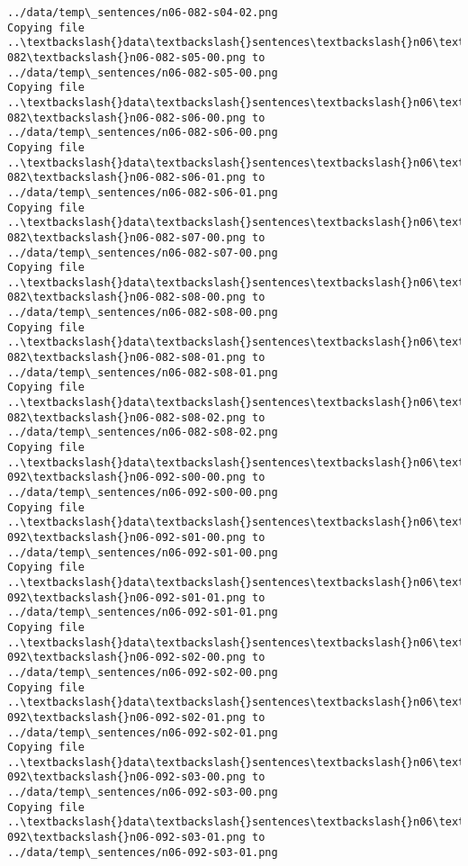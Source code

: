 \documentclass[11pt]{article}
\begin{document}
\begin{Verbatim}[commandchars=\\\{\}]
../data/temp\_sentences/n06-082-s04-02.png
Copying file ..\textbackslash{}data\textbackslash{}sentences\textbackslash{}n06\textbackslash{}n06-082\textbackslash{}n06-082-s05-00.png to
../data/temp\_sentences/n06-082-s05-00.png
Copying file ..\textbackslash{}data\textbackslash{}sentences\textbackslash{}n06\textbackslash{}n06-082\textbackslash{}n06-082-s06-00.png to
../data/temp\_sentences/n06-082-s06-00.png
Copying file ..\textbackslash{}data\textbackslash{}sentences\textbackslash{}n06\textbackslash{}n06-082\textbackslash{}n06-082-s06-01.png to
../data/temp\_sentences/n06-082-s06-01.png
Copying file ..\textbackslash{}data\textbackslash{}sentences\textbackslash{}n06\textbackslash{}n06-082\textbackslash{}n06-082-s07-00.png to
../data/temp\_sentences/n06-082-s07-00.png
Copying file ..\textbackslash{}data\textbackslash{}sentences\textbackslash{}n06\textbackslash{}n06-082\textbackslash{}n06-082-s08-00.png to
../data/temp\_sentences/n06-082-s08-00.png
Copying file ..\textbackslash{}data\textbackslash{}sentences\textbackslash{}n06\textbackslash{}n06-082\textbackslash{}n06-082-s08-01.png to
../data/temp\_sentences/n06-082-s08-01.png
Copying file ..\textbackslash{}data\textbackslash{}sentences\textbackslash{}n06\textbackslash{}n06-082\textbackslash{}n06-082-s08-02.png to
../data/temp\_sentences/n06-082-s08-02.png
Copying file ..\textbackslash{}data\textbackslash{}sentences\textbackslash{}n06\textbackslash{}n06-092\textbackslash{}n06-092-s00-00.png to
../data/temp\_sentences/n06-092-s00-00.png
Copying file ..\textbackslash{}data\textbackslash{}sentences\textbackslash{}n06\textbackslash{}n06-092\textbackslash{}n06-092-s01-00.png to
../data/temp\_sentences/n06-092-s01-00.png
Copying file ..\textbackslash{}data\textbackslash{}sentences\textbackslash{}n06\textbackslash{}n06-092\textbackslash{}n06-092-s01-01.png to
../data/temp\_sentences/n06-092-s01-01.png
Copying file ..\textbackslash{}data\textbackslash{}sentences\textbackslash{}n06\textbackslash{}n06-092\textbackslash{}n06-092-s02-00.png to
../data/temp\_sentences/n06-092-s02-00.png
Copying file ..\textbackslash{}data\textbackslash{}sentences\textbackslash{}n06\textbackslash{}n06-092\textbackslash{}n06-092-s02-01.png to
../data/temp\_sentences/n06-092-s02-01.png
Copying file ..\textbackslash{}data\textbackslash{}sentences\textbackslash{}n06\textbackslash{}n06-092\textbackslash{}n06-092-s03-00.png to
../data/temp\_sentences/n06-092-s03-00.png
Copying file ..\textbackslash{}data\textbackslash{}sentences\textbackslash{}n06\textbackslash{}n06-092\textbackslash{}n06-092-s03-01.png to
../data/temp\_sentences/n06-092-s03-01.png

\end{Verbatim}
\end{document}
